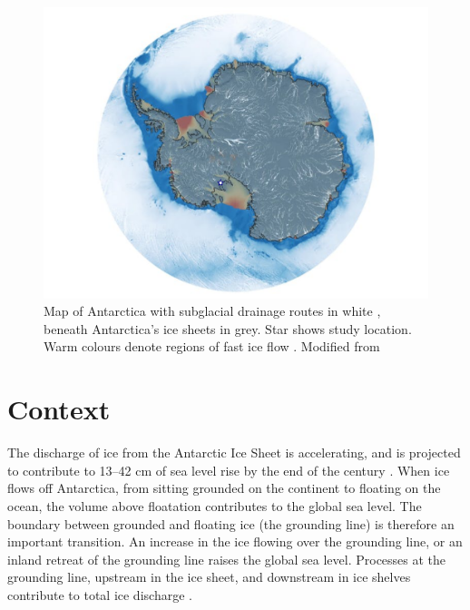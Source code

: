 \label{ch:intro}

\begin{figure}[!ht]
\centering
\includegraphics[width=1\textwidth]{chapters/1/antarctica.png}
\caption[Antarctica's subglacial drainage]{ Map of Antarctica with subglacial drainage routes in white \citep{le2009subglacial}, beneath Antarctica’s ice sheets in grey. Star shows study location. Warm colours denote regions of fast ice flow \citep{rignot2013ice}. Modified from \cite{horgan2022channel} }
\label{fig:antarctica}
\end{figure}  

\section{Context} \label{sec:context}

The discharge of ice from the Antarctic Ice Sheet is accelerating, and is projected to contribute to 13--42 cm of sea level rise by the end of the century \citep{edwards2021projected}.
When ice flows off Antarctica, from sitting grounded on the continent to floating on the ocean, the volume above floatation contributes to the global sea level. The boundary between grounded and floating ice (the grounding line) is therefore an important transition. An increase in the ice flowing over the grounding line, or an inland retreat of the grounding line raises the global sea level. Processes at the grounding line, upstream in the ice sheet, and downstream in ice shelves contribute to total ice discharge \citep{rignot2011ice}. 


